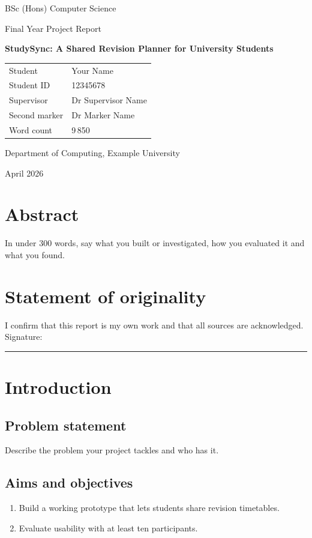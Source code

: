 \documentclass[12pt,a4paper]{report}
\begin{document}
\begin{titlepage}
\centering
\vspace*{1cm}
{\large BSc (Hons) Computer Science\par}
{\large Final Year Project Report\par}
\vspace{3cm}
{\huge\bfseries StudySync: A Shared Revision Planner for University Students\par}
\vspace{3cm}
\begin{tabularx}{0.7\linewidth}{@{}lX@{}}
Student & Your Name \\
Student ID & 12345678 \\
Supervisor & Dr Supervisor Name \\
Second marker & Dr Marker Name \\
Word count & 9\,850 \\
\end{tabularx}
\vfill
{Department of Computing, Example University\par}
{April 2026\par}
\end{titlepage}

\chapter*{Abstract}
In under 300 words, say what you built or investigated, how you evaluated it and what you found.

\chapter*{Statement of originality}
I confirm that this report is my own work and that all sources are acknowledged. \\[2em]
Signature: \rule{5cm}{0.4pt}

\tableofcontents

\clearpage
{}

\chapter{Introduction}
\section{Problem statement}
Describe the problem your project tackles and who has it.
\section{Aims and objectives}
\begin{enumerate}
  \item Build a working prototype that lets students share revision timetables.
  \item Evaluate usability with at least ten participants.
\end{enumerate}
\end{document}
